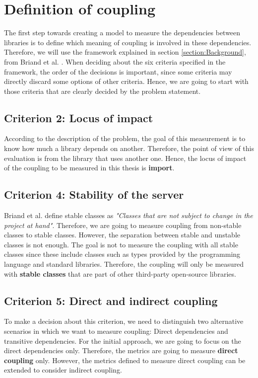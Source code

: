 \documentclass[a4paper]{article}
\begin{document}
\section{Definition of coupling}
The first step towards creating a model to measure the dependencies between libraries is to define which meaning of coupling is involved in these dependencies. Therefore, we will use the framework explained in section \ref{section:Background}, from Briand et al. \cite{briand1999unified}. When deciding about the six criteria specified in the framework, the order of the decisions is important, since some criteria may directly discard some options of other criteria. Hence, we are going to start with those criteria that are clearly decided by the problem statement.

\subsection{Criterion 2: Locus of impact}
According to the description of the problem, the goal of this measurement is to know how much a library depends on another. Therefore, the point of view of this evaluation is from the library that uses another one. Hence, the locus of impact of the coupling to be measured in this thesis is \textbf{import}.

\subsection{Criterion 4: Stability of the server}
Briand et al. \cite{briand1999unified} define stable classes as \textit{"Classes that are not subject to change in the project at hand"}. Therefore, we are going to measure coupling from non-stable classes to stable classes.
However, the separation between stable and unstable classes is not enough. The goal is not to measure the coupling with all stable classes since these include classes such as types provided by the programming language and standard libraries. Therefore, the coupling will only be measured with \textbf{stable classes} that are part of other third-party open-source libraries.

\subsection{Criterion 5: Direct and indirect coupling}
To make a decision about this criterion, we need to distinguish two alternative scenarios in which we want to measure coupling: Direct dependencies and transitive dependencies. For the initial approach, we are going to focus on the direct dependencies only. Therefore, the metrics are going to measure \textbf{direct coupling} only. However, the metrics defined to measure direct coupling can be extended to consider indirect coupling.
\end{document}
